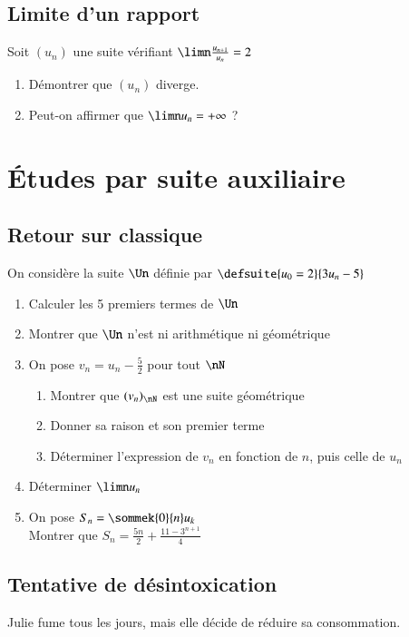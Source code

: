 \documentclass[oneside,12pt]{article}          %
\begin{document}
\subsection{Limite d'un rapport}
Soit $(u_n)$ une suite vérifiant $\limn\frac{u_{n+1}}{u_n}=2$
\begin{enumerate}
	\item Démontrer que $(u_n)$ diverge.
	\item Peut-on affirmer que $\limn u_n=+\infty$ ?
\end{enumerate}



\section{Études par suite auxiliaire}

\subsection{Retour sur classique}
On considère la suite $\Un$ définie par $\defsuite{u_0=2}{3u_n-5}$
\begin{enumerate}
    \item Calculer les 5 premiers termes de $\Un$
    \item Montrer que $\Un$ n'est ni arithmétique ni géométrique
    \item On pose $v_n=u_n-\frac{5}{2}$ pour tout $\nN$
    \begin{enumerate}
        \item Montrer que $(v_n)_{\nN}$ est une suite géométrique
        \item Donner sa raison et son premier terme
        \item Déterminer l'expression de $v_n$ en fonction de $n$, puis celle de $u_n$
    \end{enumerate}
    \item Déterminer $\limn u_n$
    \item On pose $S_n=\sommek{0}{n}u_k$\\
		Montrer que $S_n=\frac{5n}{2}+\frac{11-3^{n+1}}{4}$

\end{enumerate}



\subsection{Tentative de désintoxication}
Julie fume tous les jours, mais elle décide de réduire sa consommation.
\end{document}
